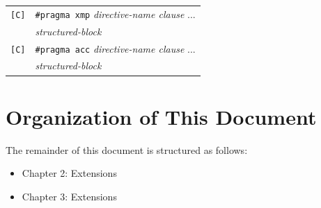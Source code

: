 \vspace{0.3cm}

\begin{tabular}{ll}
\verb![C]! & \verb|#pragma xmp| {\it directive-name clause} ...\\
 & \hspace{0.5cm} {\it structured-block} \\
\verb![C]! & \verb|#pragma acc| {\it directive-name clause} ...\\
 & \hspace{0.5cm} {\it structured-block} \\
\end{tabular}
\vspace{0.5cm}

\section{Organization of This Document}
The remainder of this document is structured as follows:

\begin{itemize}
 \item Chapter 2: {\XMP} Extensions
 \item Chapter 3: {\OACC} Extensions
\end{itemize}
